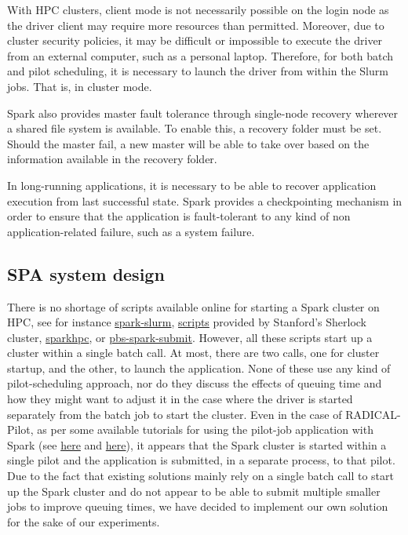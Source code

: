 	With HPC clusters, client mode is not necessarily possible on the login
	node as the driver client may require more resources than permitted.
	Moreover, due to cluster security policies, it may be difficult or
	impossible to execute the driver from an external computer, such as a
	personal laptop. Therefore, for both batch and pilot scheduling, it is
	necessary to launch the driver from within the Slurm jobs. That is, in
	cluster mode.
    
	Spark also provides master fault tolerance through single-node recovery
	wherever a shared file system is available. To enable this, a recovery
	folder must be set. Should the master fail, a new master will be able to
	take over based on the information available in the recovery folder.
    
	In long-running applications, it is necessary to be able to recover
	application execution from last successful state. Spark provides a
	checkpointing mechanism in order to ensure that the application is
	fault-tolerant to any kind of non application-related failure, such as a
	system failure.
    
	\subsection{SPA system design}
    
	There is no shortage of scripts available online for starting a Spark
	cluster on HPC, see for instance
	\href{https://github.com/NIH-HPC/spark-slurm}{spark-slurm},
	\href{https://www.sherlock.stanford.edu/docs/software/using/spark}{scripts}
	provided by Stanford's Sherlock cluster,
	\href{https://sparkhpc.readthedocs.io}{sparkhpc}, or
	\href{https://www.osc.edu/~troy/pbstools/man/pbs-spark-submit}{pbs-spark-submit}.
	However, all these scripts start up a cluster within a single batch
	call. At most, there are two calls, one for cluster startup, and the
	other, to launch the application. None of these use any kind of
	pilot-scheduling approach, nor do they discuss the effects of queuing
	time and how they might want to adjust it in the case where the driver
	is started separately from the batch job to start the cluster. Even in
	the case of RADICAL-Pilot, as per some available tutorials for using the
	pilot-job application with Spark (see
	\href{https://github.com/radical-cybertools/pilot-streaming/blob/master/examples/Pilot-Streaming-GettingStarted.ipynb}{here}
	and
	\href{https://github.com/radical-cybertools/MIDAS-tutorial/blob/master/pilot/Pilot-Spark.ipynb}{here}),
	it appears that the Spark cluster is started within a single pilot and
	the application is submitted, in a separate process, to that pilot. Due
	to the fact that existing solutions mainly rely on a single batch call
	to start up the Spark cluster and do not appear to be able to submit
	multiple smaller jobs to improve queuing times, we have decided to
	implement our own solution for the sake of our experiments.
    
